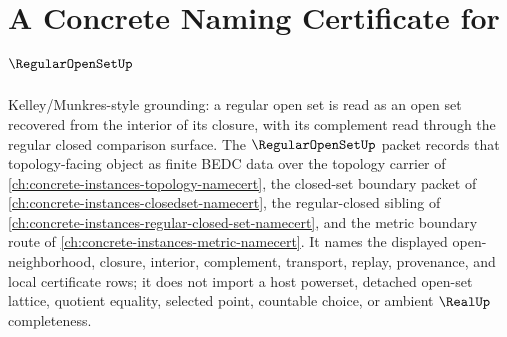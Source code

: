 \chapter{A Concrete Naming Certificate for $\RegularOpenSetUp$}
\label{ch:concrete-instances-regular-open-set-namecert}

Kelley/Munkres-style grounding: a regular open set is read as an open set recovered from the interior of its closure, with its complement read through the regular closed comparison surface. The $\RegularOpenSetUp$ packet records that topology-facing object as finite BEDC data over the topology carrier of \autoref{ch:concrete-instances-topology-namecert}, the closed-set boundary packet of \autoref{ch:concrete-instances-closedset-namecert}, the regular-closed sibling of \autoref{ch:concrete-instances-regular-closed-set-namecert}, and the metric boundary route of \autoref{ch:concrete-instances-metric-namecert}. It names the displayed open-neighborhood, closure, interior, complement, transport, replay, provenance, and local certificate rows; it does not import a host powerset, detached open-set lattice, quotient equality, selected point, countable choice, or ambient $\RealUp$ completeness.

